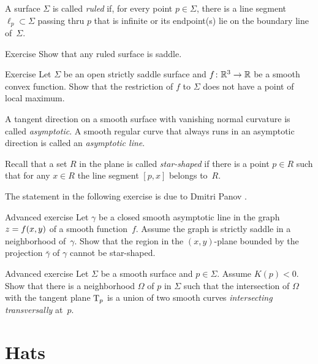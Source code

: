 A surface $\Sigma$ is called \emph{ruled} if, for every point $p\in \Sigma$, there is a line segment $\ell_p\subset \Sigma$ passing thru $p$ that is infinite or its endpoint(s) lie on the boundary line of~$\Sigma$.

\begin{thm}{Exercise}\label{ex:ruled=>saddle}
Show that any ruled surface is saddle.
\end{thm}

\begin{thm}{Exercise}\label{ex:saddle-convex}
Let $\Sigma$ be an open strictly saddle surface and $f\:\mathbb{R}^3\z\to\mathbb{R}$ be a smooth convex function.
Show that the restriction of $f$ to $\Sigma$ does not have a point of local maximum.
\end{thm}

A tangent direction on a smooth surface with vanishing normal curvature is called \emph{asymptotic}.
A smooth regular curve that always runs in an asymptotic direction is called an
{}\emph{asymptotic line}.\label{page:asymptotic line}

Recall that a set $R$ in the plane is called \emph{star-shaped} if there is a point $p\in R$ such that for any $x\in R$ the line segment $[p,x]$ belongs to~$R$.

The statement in the following exercise is due to Dmitri Panov \cite{panov-curves}.

\begin{thm}{Advanced exercise}\label{ex:panov}
Let $\gamma$ be a closed smooth asymptotic line
in the graph $z\z=f(x,y)$ of a smooth function~$f$. 
Assume the graph is strictly saddle in a neighborhood of~$\gamma$.
Show that the region in the $(x,y)$-plane bounded by the projection $\bar \gamma$ of $\gamma$ cannot be star-shaped. 
\end{thm}

\begin{thm}{Advanced exercise}\label{ex:crosss}
Let $\Sigma$ be a smooth surface and $p\in \Sigma$.
Assume $K(p)<0$.
Show that there is a neighborhood $\Omega$ of $p$ in $\Sigma$
such that the intersection of $\Omega$ with the tangent plane $\mathrm{T}_p$ is a union of two smooth curves  \emph{intersecting transversally} at~$p$.
\end{thm}


\section{Hats}

